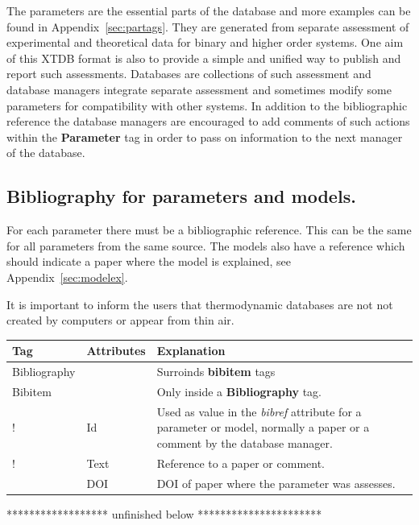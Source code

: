 \documentclass{article}
\begin{document}
The parameters are the essential parts of the database and more
examples can be found in Appendix~\ref{sec:partags}.  They are
generated from separate assessment of experimental and theoretical
data for binary and higher order systems.  One aim of this XTDB format
is also to provide a simple and unified way to publish and report such
assessments.  Databases are collections of such assessment and
database managers integrate separate assessment and sometimes modify
some parameters for compatibility with other systems.  In addition to
the bibliographic reference the database managers are encouraged to
add comments of such actions within the {\bf Parameter} tag in order
to pass on information to the next manager of the database.

\newpage

\subsection{Bibliography for parameters and models.}\label{sec:biblio}

For each parameter there must be a bibliographic reference.  This can
be the same for all parameters from the same source.  The models also
have a reference which should indicate a paper where the model is
explained, see Appendix~\ref{sec:modelex}.

It is important to inform the users that thermodynamic databases are
not not created by computers or appear from thin air.

\bigskip
\begin{tabular}{|p{} p{} p{}|}\hline
  Tag & Attributes &  Explanation\\\hline

  Bibliography & & Surroinds {\bf bibitem} tags\\\hline

  Bibitem & & Only inside a {\bf Bibliography} tag.\\
!      & Id &   Used as value in the {\em bibref} attribute for a parameter
            or model, normally a paper or a comment by the database manager.\\
!      & Text & Reference to a paper or comment.\\
       & DOI & DOI of paper where the parameter was assesses.\\\hline
\end{tabular}

\newpage

****************** unfinished below **********************
\end{document}
